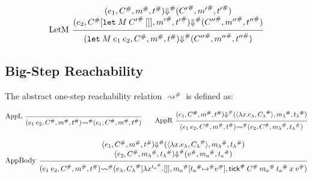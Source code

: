 \documentclass{article}
\theoremstyle{definition}
\newcommand*{\A}[1]{{#1}^{\#}}
\newcommand*{\mem}{m}
\newcommand*{\tick}{\mathsf{tick}}
\begin{document}
\[
  \begin{prooftree}
    \hypo{
      \begin{matrix}
        (e_{1}, \A{C}, \A{\mem}, \A{t})
        \A\Downarrow
        (\A{C'}, \A{\mem'}, \A{t'}) \\
        (e_{2}, \A{C}[\mathtt{let}\:M\:\A{C'}\:[]], \A{\mem'}, \A{t'})
        \A\Downarrow
        (\A{C''}, \A{\mem''}, \A{t''})
      \end{matrix}
    }
    \infer[left label=LetM]1{
    (\mathtt{let}\:M\:e_{1}\:e_{2}, \A{C}, \A{\mem}, \A{t})
    \A\Downarrow
    (\A{C''}, \A{\mem''}, \A{t''})
    }
  \end{prooftree}
\]

\subsection{Big-Step Reachability}
The abstract one-step reachability relation $\A\rightsquigarrow$ is defined as:

\[
  \begin{prooftree}
    \infer[left label={AppL}]0{
    (e_{1}\:e_{2}, \A{C}, \A{\mem}, \A{t})
    \A\rightsquigarrow
    (e_{1}, \A{C}, \A{\mem}, \A{t})
    }
  \end{prooftree}\qquad
  \begin{prooftree}
    \hypo{
      \begin{matrix}
        (e_{1}, \A{C}, \A{\mem}, \A{t})
        \A{\Downarrow}
        (\langle\lambda x.e_{\lambda}, \A{C_{\lambda}}\rangle, \A{\mem_{\lambda}}, \A{t_{\lambda}})
      \end{matrix}
    }
    \infer[left label={AppR}]1{
    (e_{1}\:e_{2}, \A{C}, \A{\mem}, \A{t})
    \A\rightsquigarrow
    (e_{2}, \A{C}, \A{\mem_{\lambda}}, \A{t_{\lambda}})
    }
  \end{prooftree}
\]

\[
  \begin{prooftree}
    \hypo{
      \begin{matrix}
        (e_{1}, \A{C}, \A{\mem}, \A{t})
        \A{\Downarrow}
        (\langle\lambda x.e_{\lambda}, \A{C_{\lambda}}\rangle, \A{\mem_{\lambda}}, \A{t_{\lambda}}) \\
        (e_{2}, \A{C}, \A{\mem_{\lambda}}, \A{t_{\lambda}})
        \A{\Downarrow}
        (\A{v}, \A{\mem_{a}}, \A{t_{a}})
      \end{matrix}
    }
    \infer[left label={AppBody}]1{
    (e_{1}\:e_{2}, \A{C}, \A{\mem}, \A{t})
    \A\rightsquigarrow
    (e_{\lambda}, \A{C_{\lambda}}[\lambda x^{\A{t_{a}}}.[]], \A{\mem_{a}}[\A{t_{a}}\A{\mapsto} \A{v}], \A{\tick}\:\A{C}\:\A{\mem_a}\:\A{t_{a}}\:x\:\A{v})
    }
  \end{prooftree}
\]
\end{document}
